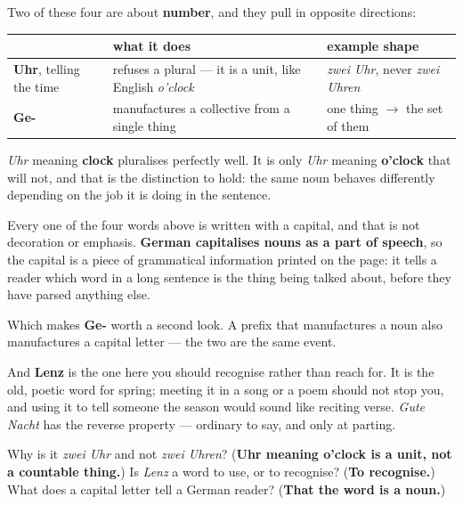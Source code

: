 \begin{grammarlens}[title={Grammar Lens: a word can be a counter without being countable}]
Two of these four are about \textbf{number}, and they pull in opposite directions:

\noindent
\begin{tabularx}{\linewidth}{@{}>{\raggedright\arraybackslash}X>{\raggedright\arraybackslash}X>{\raggedright\arraybackslash}X@{}}
\toprule
\textbf{} & \textbf{what it does} & \textbf{example shape} \\
\midrule
\textbf{Uhr}, telling the time & refuses a plural — it is a unit, like English \emph{o'clock} & \emph{zwei Uhr}, never \emph{zwei Uhren} \\
\textbf{Ge-} & manufactures a collective from a single thing & one thing \textbf{$\to$} the set of them \\
\bottomrule
\end{tabularx}

\emph{Uhr} meaning \textbf{clock} pluralises perfectly well. It is only \emph{Uhr} meaning \textbf{o'clock} that will not, and that is the distinction to hold: the same noun behaves differently depending on the job it is doing in the sentence.
\end{grammarlens}

\begin{culture}
Every one of the four words above is written with a capital, and that is not decoration or emphasis. \textbf{German capitalises nouns as a part of speech}, so the capital is a piece of grammatical information printed on the page: it tells a reader which word in a long sentence is the thing being talked about, before they have parsed anything else.

Which makes \textbf{Ge-} worth a second look. A prefix that manufactures a noun also manufactures a capital letter — the two are the same event.

And \textbf{Lenz} is the one here you should recognise rather than reach for. It is the old, poetic word for spring; meeting it in a song or a poem should not stop you, and using it to tell someone the season would sound like reciting verse. \emph{Gute Nacht} has the reverse property — ordinary to say, and only at parting.
\end{culture}

\begin{tcolorbox}[breakable,colback=teal!4,colframe=teal!35!black,title={Before you move on}]
Why is it \emph{zwei Uhr} and not \emph{zwei Uhren}? (\textbf{Uhr meaning o'clock is a unit, not a countable thing.}) Is \emph{Lenz} a word to use, or to recognise? (\textbf{To recognise.}) What does a capital letter tell a German reader? (\textbf{That the word is a noun.})
\end{tcolorbox}
